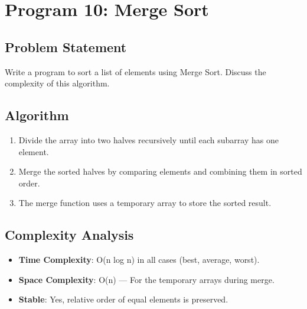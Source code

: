 \documentclass[a4paper,12pt]{article}
\begin{document}
\section*{Program 10: Merge Sort}

\subsection*{Problem Statement}
Write a program to sort a list of elements using Merge Sort. Discuss the complexity of this algorithm.

\subsection*{Algorithm}
\begin{enumerate}
    \item Divide the array into two halves recursively until each subarray has one element.
    \item Merge the sorted halves by comparing elements and combining them in sorted order.
    \item The merge function uses a temporary array to store the sorted result.
\end{enumerate}

\subsection*{Complexity Analysis}
\begin{itemize}
    \item \textbf{Time Complexity}: O(n log n) in all cases (best, average, worst).
    \item \textbf{Space Complexity}: O(n) — For the temporary arrays during merge.
    \item \textbf{Stable}: Yes, relative order of equal elements is preserved.
\end{itemize}
\end{document}
